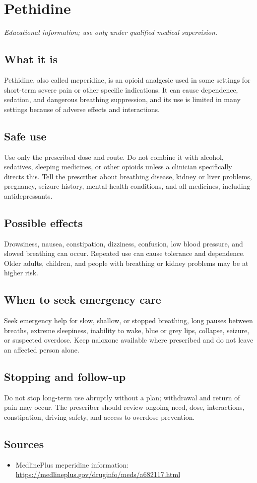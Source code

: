 \chapter{Pethidine}

\medskip
\noindent\textit{Educational information; use only under qualified medical supervision.}

\section*{What it is}
Pethidine, also called meperidine, is an opioid analgesic used in some settings for short-term severe pain or other specific indications. It can cause dependence, sedation, and dangerous breathing suppression, and its use is limited in many settings because of adverse effects and interactions.

\section*{Safe use}
Use only the prescribed dose and route. Do not combine it with alcohol, sedatives, sleeping medicines, or other opioids unless a clinician specifically directs this. Tell the prescriber about breathing disease, kidney or liver problems, pregnancy, seizure history, mental-health conditions, and all medicines, including antidepressants.

\section*{Possible effects}
Drowsiness, nausea, constipation, dizziness, confusion, low blood pressure, and slowed breathing can occur. Repeated use can cause tolerance and dependence. Older adults, children, and people with breathing or kidney problems may be at higher risk.

\section*{When to seek emergency care}
Seek emergency help for slow, shallow, or stopped breathing, long pauses between breaths, extreme sleepiness, inability to wake, blue or grey lips, collapse, seizure, or suspected overdose. Keep naloxone available where prescribed and do not leave an affected person alone.

\section*{Stopping and follow-up}
Do not stop long-term use abruptly without a plan; withdrawal and return of pain may occur. The prescriber should review ongoing need, dose, interactions, constipation, driving safety, and access to overdose prevention.

\section*{Sources}
\begin{itemize}
\item MedlinePlus meperidine information: \url{https://medlineplus.gov/druginfo/meds/a682117.html}
\end{itemize}
